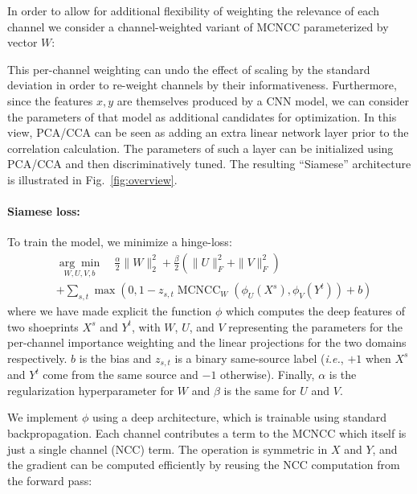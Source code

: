\documentclass[twocolumn]{svjour3}           %
\newcommand{\ie}{\emph{i.e.}}
\begin{document}
In order to allow for additional flexibility of weighting the relevance of each
channel we consider a channel-weighted variant of MCNCC parameterized by vector
$W$:

This per-channel weighting can undo the effect of scaling by the standard
deviation in order to re-weight channels by their informativeness.
Furthermore, since the features $x,y$ are themselves produced by a CNN model,
we can consider the parameters of that model as additional candidates for
optimization.  In this view, PCA/CCA can be seen as adding an extra linear
network layer prior to the correlation calculation.  The parameters of such a
layer can be initialized using PCA/CCA and then discriminatively tuned. The
resulting ``Siamese'' architecture is illustrated in Fig.~\ref{fig:overview}.

\paragraph{Siamese loss:} To train the model, we minimize a hinge-loss:
\begin{align}
  &\underset{W,U,V,b}{\arg\min} \quad\frac{\alpha}{2}\|W\|_2^2
    + \frac{\beta}{2}\left( \|U\|_F^2 + \|V\|_F^2 \right) \\\nonumber
  &+ \sum_{s,t} \operatorname{max}\left( 0,
    1 - z_{s,t}\operatorname{MCNCC}_{W}(\phi_{U}(X^s),\phi_{V}(Y^t)) + b
               \right)
\end{align}
where we have made explicit the function $\phi$ which computes the deep
features of two shoeprints $X^s$ and $Y^t$, with $W$, $U$, and $V$ representing
the parameters for the per-channel importance weighting and the linear
projections for the two domains respectively.
$b$ is the bias and $z_{s,t}$ is a binary same-source label (\ie, $+1$ when $X^s$ and
$Y^t$ come from the same source and $-1$ otherwise).
Finally, $\alpha$ is the regularization hyperparameter for $W$ and $\beta$ is
the same for $U$ and $V$.

We implement $\phi$ using a deep architecture, which is trainable using
standard backpropagation. Each channel contributes a term to the MCNCC
which itself is just a single channel (NCC) term.  The operation is symmetric in
$X$ and $Y$, and the gradient can be computed efficiently by reusing the NCC
computation from the forward pass:
\end{document}
